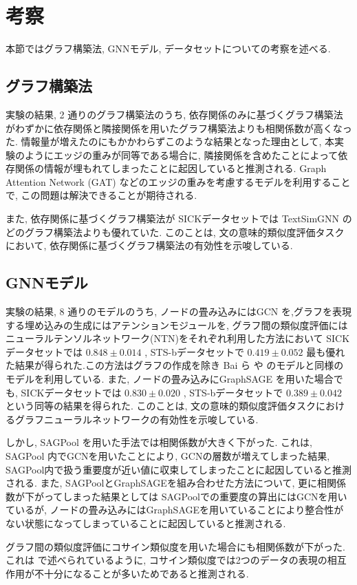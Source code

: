 \documentclass[a4j,twoside,12pt]{thesis} %
\begin{document}
\addtocounter{chapter}{+4}
\setlength{\baselineskip}{1.95zw}
\setlength{\textheight}{30\baselineskip}
\mainmatter

\fi

\chapter{考察}\label{dis}
本節ではグラフ構築法, GNNモデル, データセットについての考察を述べる.
\section{グラフ構築法}
実験の結果, 2 通りのグラフ構築法のうち, 依存関係のみに基づくグラフ構築法がわずかに依存関係と隣接関係を用いたグラフ構築法よりも相関係数が高くなった.
情報量が増えたのにもかかわらずこのような結果となった理由として, 本実験のようにエッジの重みが同等である場合に, 隣接関係を含めたことによって依存関係の情報が埋もれてしまったことに起因していると推測される. Graph Attention Network (GAT) などのエッジの重みを考慮するモデルを利用することで, この問題は解決できることが期待される.
\par また, 依存関係に基づくグラフ構築法が SICKデータセットでは TextSimGNN \cite{zhou2020sentence} のどのグラフ構築法よりも優れていた. このことは, 文の意味的類似度評価タスクにおいて, 依存関係に基づくグラフ構築法の有効性を示唆している.
\section{GNNモデル}
実験の結果, 8 通りのモデルのうち, ノードの畳み込みにはGCN\cite{kipf2017semi} を,グラフを表現する埋め込みの生成にはアテンションモジュール\cite{bai2019simgnn}を, グラフ間の類似度評価にはニューラルテンソルネットワーク(NTN)\cite{bai2019simgnn}をそれぞれ利用した方法において SICKデータセットでは $0.848 \pm 0.014$ , STS-bデータセットで $0.419 \pm 0.052$ 最も優れた結果が得られた.この方法はグラフの作成を除き Bai ら\cite{bai2019simgnn} や \cite{zhou2020sentence} のモデルと同様のモデルを利用している. また, ノードの畳み込みにGraphSAGE \cite{hamilton2017inductive} を用いた場合でも, SICKデータセットでは $0.830 \pm 0.020$ , STS-bデータセットで $0.389 \pm 0.042$ という同等の結果を得られた. このことは, 文の意味的類似度評価タスクにおけるグラフニューラルネットワークの有効性を示唆している.
\par しかし, SAGPool を用いた手法では相関係数が大きく下がった. これは, SAGPool 内でGCNを用いたことにより, GCNの層数が増えてしまった結果, SAGPool内で扱う重要度が近い値に収束してしまったことに起因していると推測される. また, SAGPoolとGraphSAGEを組み合わせた方法について, 更に相関係数が下がってしまった結果としては SAGPoolでの重要度の算出にはGCNを用いているが, ノードの畳み込みにはGraphSAGEを用いていることにより整合性がない状態になってしまっていることに起因していると推測される.
\par グラフ間の類似度評価にコサイン類似度を用いた場合にも相関係数が下がった.これは \cite{} で述べられているように, コサイン類似度では2つのデータの表現の相互作用が不十分になることが多いためであると推測される.
\end{document}

